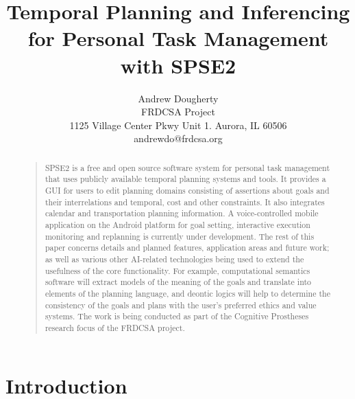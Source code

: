 \documentclass[letterpaper]{article}
\title{Temporal Planning and Inferencing for Personal Task Management with SPSE2}
\author{Andrew Dougherty\\
FRDCSA Project\\
1125 Village Center Pkwy Unit 1.  Aurora, IL 60506\\
andrewdo@frdcsa.org\\
}
\begin{document}
 
\maketitle
\begin{abstract}
\begin{quote}

SPSE2 is a free and open source software system for personal task
management that uses publicly available temporal planning systems and
tools.  It provides a GUI for users to edit planning domains
consisting of assertions about goals and their interrelations and
temporal, cost and other constraints.  It also integrates calendar and
transportation planning information.  A voice-controlled mobile
application on the Android platform for goal setting, interactive
execution monitoring and replanning is currently under development.
The rest of this paper concerns details and planned features,
application areas and future work; as well as various other AI-related
technologies being used to extend the usefulness of the core
functionality.  For example, computational semantics software will
extract models of the meaning of the goals and translate into elements
of the planning language, and deontic logics will help to determine
the consistency of the goals and plans with the user's preferred
ethics and value systems.  The work is being conducted as part of the
Cognitive Prostheses research focus of the FRDCSA project.

\end{quote}
\end{abstract}

\section{Introduction}
\end{document}
